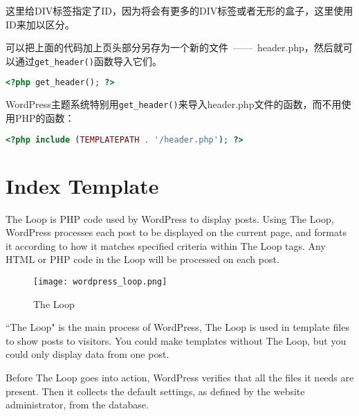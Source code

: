 这里给DIV标签指定了ID，因为将会有更多的DIV标签或者无形的盒子，这里使用ID来加以区分。

可以把上面的代码加上页头部分另存为一个新的文件~——~header.php，然后就可以通过\texttt{get\_header()}函数导入它们。

\begin{lstlisting}[language=PHP]
<?php get_header(); ?>
\end{lstlisting}


WordPress主题系统特别用\texttt{get\_header()}来导入header.php文件的函数，而不用使用PHP的函数：

\begin{lstlisting}[language=PHP]
<?php include (TEMPLATEPATH . '/header.php'); ?>
\end{lstlisting}





























\section{Index Template}


The Loop is PHP code used by WordPress to display posts. Using The Loop, WordPress processes each post to be displayed on the current page, and formats it according to how it matches specified criteria within The Loop tags. Any HTML or PHP code in the Loop will be processed on each post.

\begin{figure}[!ht]
\centering
\texttt{[image: wordpress\_loop.png]}
\caption{The Loop}
\end{figure}

``The Loop" is the main process of WordPress, The Loop is used in template files to show posts to visitors. You could make templates without The Loop, but you could only display data from one post.

Before The Loop goes into action, WordPress verifies that all the files it needs are present. Then it collects the default settings, as defined by the website administrator, from the database. 

